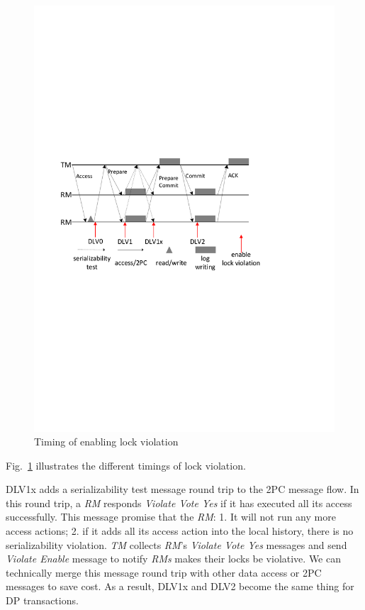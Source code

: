\documentclass[conference]{IEEEtran}
\begin{document}
\begin{figure}[tbp]
  \centerline{\includegraphics[scale=0.50]{lock_violation_time.pdf}}
  \caption
  {Timing of enabling lock violation}
\label{fig:lock_violation_time}
\end{figure}

Fig.~\ref{fig:lock_violation_time} illustrates the different timings of lock violation.

DLV1x adds a serializability test message round trip to the 2PC message flow.
In this round trip, a \emph{RM} responds \emph{Violate Vote Yes} if it has executed all its access successfully.
This message promise that the \emph{RM}: 1. It will not run any more access actions; 2. if it adds all its access action into the local history, there is no serializability violation.
\emph{TM} collects \emph{RM}'s \emph{Violate Vote Yes} messages and send \emph{Violate Enable} message to notify \emph{RMs} makes their locks be violative.
We can technically merge this message round trip with other data access or 2PC messages to save cost.
As a result, DLV1x and DLV2 become the same thing for DP transactions.
\end{document}
